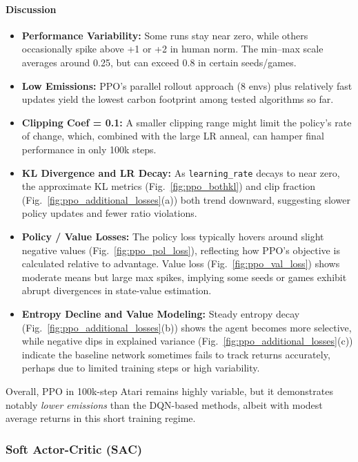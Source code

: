 \paragraph{Discussion}
\begin{itemize}
	\item \textbf{Performance Variability:} 
	Some runs stay near zero, while others occasionally spike above +1 or +2 in human norm. 
	The min--max scale averages around 0.25, but can exceed 0.8 in certain seeds/games.
	\item \textbf{Low Emissions:} 
	PPO’s parallel rollout approach (8 envs) plus relatively fast updates 
	yield the lowest carbon footprint among tested algorithms so far.
	\item \textbf{Clipping Coef = 0.1:} 
	A smaller clipping range might limit the policy’s rate of change, 
	which, combined with the large LR anneal, can hamper final performance in only 100k steps.
	\item \textbf{KL Divergence and LR Decay:} 
	As \texttt{learning\_rate} decays to near zero, 
	the approximate KL metrics (Fig.~\ref{fig:ppo_bothkl}) 
	and clip fraction (Fig.~\ref{fig:ppo_additional_losses}(a)) both trend downward, 
	suggesting slower policy updates and fewer ratio violations.
	\item \textbf{Policy / Value Losses:} 
	The policy loss typically hovers around slight negative values (Fig.~\ref{fig:ppo_pol_loss}), 
	reflecting how PPO’s objective is calculated relative to advantage. 
	Value loss (Fig.~\ref{fig:ppo_val_loss}) shows moderate means but large max spikes, 
	implying some seeds or games exhibit abrupt divergences in state-value estimation.
	\item \textbf{Entropy Decline and Value Modeling:} 
	Steady entropy decay (Fig.~\ref{fig:ppo_additional_losses}(b)) shows the agent becomes more selective, 
	while negative dips in explained variance (Fig.~\ref{fig:ppo_additional_losses}(c)) 
	indicate the baseline network sometimes fails to track returns accurately, 
	perhaps due to limited training steps or high variability.
\end{itemize}

Overall, PPO in 100k-step Atari remains highly variable, but it demonstrates 
notably \emph{lower emissions} than the DQN-based methods, 
albeit with modest average returns in this short training regime.


\subsubsection{Soft Actor-Critic (SAC)}
\label{subsubsec:sac}

